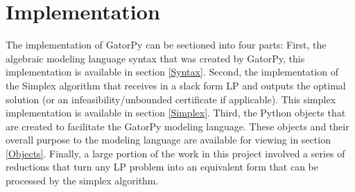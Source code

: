 \documentclass[conference]{IEEEtran}
\begin{document}
\section{Implementation}
The implementation of GatorPy can be sectioned into four parts:
First, the algebraic modeling language syntax that was created by GatorPy, this implementation is available in section \ref{Syntax}.
Second, the implementation of the Simplex algorithm that receives in a slack form LP and outputs the optimal solution (or an infeasibility/unbounded certificate if applicable).
This simplex implementation is available in section \ref{Simplex}.
Third, the Python objects that are created to facilitate the GatorPy modeling language.
These objects and their overall purpose to the modeling language are available for viewing in section \ref{Objects}.
Finally, a large portion of the work in this project involved a series of reductions that turn any LP problem into an equivalent form that can be processed by the simplex algorithm.
\end{document}
